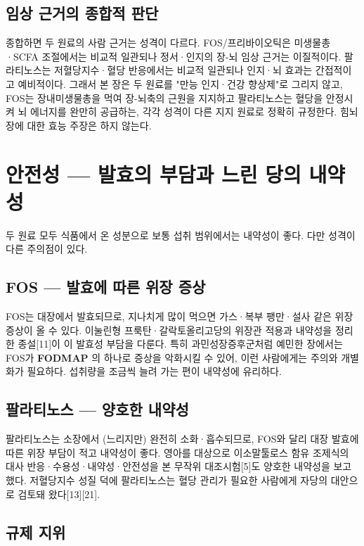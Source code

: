 \documentclass[12pt,oneside]{book}
\begin{document}
\subsection{임상 근거의 종합적 판단}

종합하면 두 원료의 사람 근거는 성격이 다르다. FOS/프리바이오틱은 미생물총·SCFA 조절에서는 비교적 일관되나 정서·인지의 장-뇌 임상 근거는 이질적이다. 팔라티노스는 저혈당지수·혈당 반응에서는 비교적 일관되나 인지·뇌 효과는 간접적이고 예비적이다. 그래서 본 장은 두 원료를 "만능 인지·건강 향상제"로 그리지 않고, FOS는 장내미생물총을 먹여 장-뇌축의 근원을 지지하고 팔라티노스는 혈당을 안정시켜 뇌 에너지를 완만히 공급하는, 각각 성격이 다른 지지 원료로 정확히 규정한다. 힘뇌장에 대한 효능 주장은 하지 않는다.

\section{안전성 — 발효의 부담과 느린 당의 내약성}

두 원료 모두 식품에서 온 성분으로 보통 섭취 범위에서는 내약성이 좋다. 다만 성격이 다른 주의점이 있다.

\subsection{FOS — 발효에 따른 위장 증상}

FOS는 대장에서 발효되므로, 지나치게 많이 먹으면 가스·복부 팽만·설사 같은 위장 증상이 올 수 있다. 이눌린형 프룩탄·갈락토올리고당의 위장관 적용과 내약성을 정리한 종설[11]이 이 발효성 부담을 다룬다. 특히 과민성장증후군처럼 예민한 장에서는 FOS가 \textbf{FODMAP} 의 하나로 증상을 악화시킬 수 있어, 이런 사람에게는 주의와 개별화가 필요하다. 섭취량을 조금씩 늘려 가는 편이 내약성에 유리하다.

\subsection{팔라티노스 — 양호한 내약성}

팔라티노스는 소장에서 (느리지만) 완전히 소화·흡수되므로, FOS와 달리 대장 발효에 따른 위장 부담이 적고 내약성이 좋다. 영아를 대상으로 이소말툴로스 함유 조제식의 대사 반응·수용성·내약성·안전성을 본 무작위 대조시험[5]도 양호한 내약성을 보고했다. 저혈당지수 성질 덕에 팔라티노스는 혈당 관리가 필요한 사람에게 자당의 대안으로 검토돼 왔다[13][21].

\subsection{규제 지위}
\end{document}
